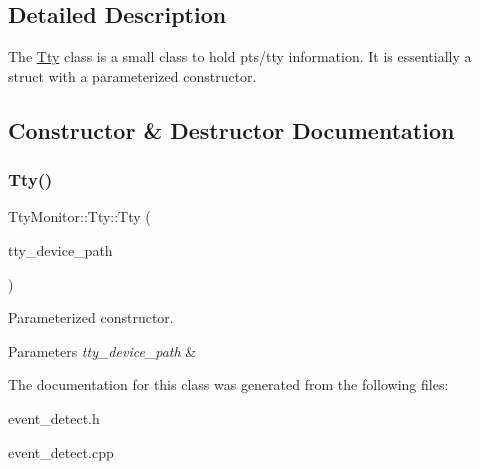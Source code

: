 \subsection{Detailed Description}
The \mbox{\hyperlink{classEventDetect_1_1TtyMonitor_1_1Tty}{Tty}} class is a small class to hold pts/tty information. It is essentially a struct with a parameterized constructor. 

\subsection{Constructor \& Destructor Documentation}
\mbox{\label{classEventDetect_1_1TtyMonitor_1_1Tty_a178d55091f19e95e818db82979748a00}} 
\subsubsection{\texorpdfstring{Tty()}{Tty()}}
{\footnotesize\ttfamily Tty\+Monitor\+::\+Tty\+::\+Tty (\begin{DoxyParamCaption}\item[{const fs\+::path \&}]{tty\+\_\+device\+\_\+path }\end{DoxyParamCaption})\hspace{0.3cm}{\ttfamily [explicit]}}



Parameterized constructor. 


\begin{DoxyParams}{Parameters}
{\em tty\+\_\+device\+\_\+path} & \\
\hline
\end{DoxyParams}


The documentation for this class was generated from the following files\+:\begin{DoxyCompactItemize}
\item 
event\+\_\+detect.\+h\item 
event\+\_\+detect.\+cpp\end{DoxyCompactItemize}
